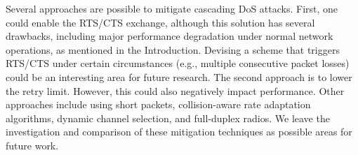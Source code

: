 \documentclass{IEEEtran}
\begin{document}
Several approaches are possible to mitigate cascading DoS attacks. First, one could enable the RTS/CTS exchange, although this solution has several
drawbacks, including major performance degradation under normal network operations, as mentioned in the Introduction. Devising a scheme that triggers RTS/CTS under certain circumstances (e.g., multiple consecutive packet losses) could be an interesting area for future research.
The second approach is to
lower the retry limit. However, this could also negatively impact performance. Other approaches include using short packets, collision-aware rate
adaptation algorithms, dynamic channel selection, and full-duplex radios. We leave the investigation and comparison of these
mitigation techniques as possible areas for future work.










\end{document}
